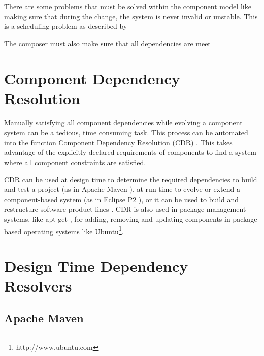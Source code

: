 

There are some problems that must be solved within the component model like making sure that during the change,
the system is never invalid or unstable. 
This is a scheduling problem as described by %

The composer must also make sure that all dependencies are meet

\section{Component Dependency Resolution}
Manually satisfying all component dependencies while evolving a component system can be a tedious, time consuming task.
This process can be automated into the function Component Dependency Resolution (CDR) \cite{Jenson2010}.
This takes advantage of the explicitly declared requirements of components to find a system where all component constraints are satisfied.

CDR can be used at design time to determine the required dependencies to build and test a project (as in Apache Maven \cite{casey_better_2008}),
at run time to evolve or extend a component-based system (as in Eclipse P2 \cite{leBerre2010}),
or it can be used to build and restructure software product lines \cite{savolainen_analyzing_2007}.
CDR is also used in package management systems, like apt-get \cite{Barth2005},
for adding, removing and updating components in package based operating systems like Ubuntu\footnote{http://www.ubuntu.com}. 


\section{Design Time Dependency Resolvers}

\subsection{Apache Maven}

